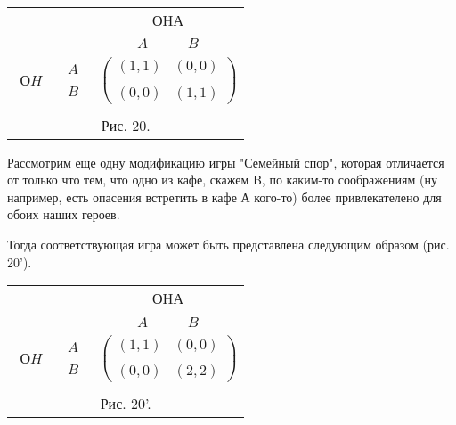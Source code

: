 \documentclass[12pt]{article}
\begin{document}
{\begin{center}
\begin{tabular}{ccc}
&&ОHА\\
&&$\begin{array}{cc} A\quad&\quad B\end{array}$\\
$\begin{array}{c} \\ ОH\\ \end{array}$& $\begin{array}{c} A\\ \\
B\end{array}$& $\left(\begin{array}{cc}
(1,1)&(0,0)\\
\\
(0,0)&(1,1)\end{array}\right) $\\
\multicolumn{3}{c}{}\\
\multicolumn{3}{c}{Рис. 20.}\\
\end{tabular}
\end{center}


Рассмотрим еще одну модификацию игры "Семейный спор", которая
отличается от только что тем, что одно из кафе, скажем B, по
каким-то соображениям (ну например, есть опасения встретить в кафе А
кого-то) более привлекателено для обоих наших героев.

Тогда соответствующая игра может быть представлена следующим образом
(рис. 20').

\begin{center}
\begin{tabular}{ccc}
&&ОHА\\
&&$\begin{array}{cc} A\quad&\quad B\end{array}$\\
$\begin{array}{c} \\ ОH\\ \end{array}$& $\begin{array}{c} A\\ \\
B\end{array}$& $\left(\begin{array}{cc}
(1,1)&(0,0)\\
\\
(0,0)&(2,2)\end{array}\right) $\\
\multicolumn{3}{c}{}\\
\multicolumn{3}{c}{Рис. 20'.}\\
\end{tabular}
\end{center}

}
\end{document}
